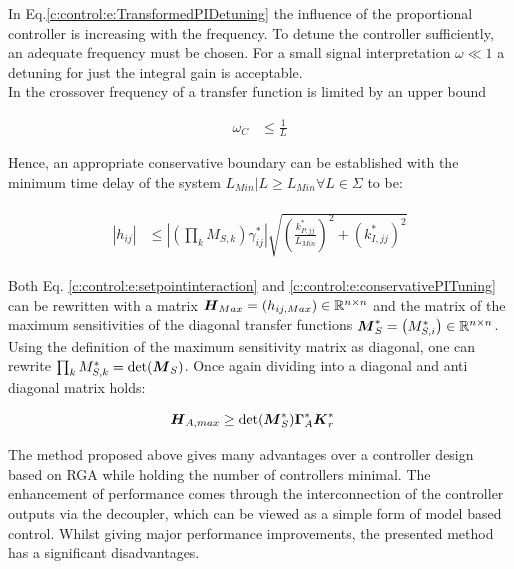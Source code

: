 In Eq.\ref{c:control:e:TransformedPIDetuning} the influence of the proportional controller is increasing with the frequency. To detune the controller sufficiently, an adequate frequency must be chosen. For a small signal interpretation $\omega \ll 1$ a detuning for just the integral gain is acceptable.\\

In \cite[p.172 f.]{Skogestad2005MultivariableDesign} the crossover frequency of a transfer function is limited by an upper bound

\begin{align}
\omega_C &\leq \frac{1}{L}
\end{align}

Hence, an appropriate conservative boundary can be established with the minimum time delay of the system $L_{Min} | L\geq L_{Min} \forall L \in \Sigma $ to be:

\begin{align}
\begin{split}
\left| h_{ij} \right| &\leq \left| \left(\prod_k M_{S,k} \right) \gamma_{ij}^*\right| \sqrt{\left(\frac{k_{P,jj}^*}{L_{Min}}\right)^2+ \left(k_{I,jj}^*\right)^2}
\end{split}
\label{c:control:e:conservativePITuning}
\end{align}

Both Eq. \ref{c:control:e:setpointinteraction} and \ref{c:control:e:conservativePITuning} can be rewritten with a matrix $\mbox{\boldmath$H$}_{Max} = \left(h_{ij,Max}\right) \in \mathbb{R}^{n \times n}$ and the matrix of the maximum sensitivities of the diagonal transfer functions $\mbox{\boldmath$M$}_S^* = \left(M_{S,i}^*\right) \in \mathbb{R}^{n \times n}$. Using the definition of the maximum sensitivity matrix as diagonal, one can rewrite $\prod_k M_{S,k}^* = \det(\mbox{\boldmath$M$}_S) $. Once again dividing into a diagonal and anti diagonal matrix holds:

\begin{align}
\begin{split}
\mbox{\boldmath$H$}_{A,max} &\geq \det(\mbox{\boldmath$M$}_S^*) \mbox{\boldmath$\Gamma$}_A^* \mbox{\boldmath$K$}_r^* 
\end{split}
\label{c:control:e:Hmax*}
\end{align}



The method proposed above gives many advantages over a controller design based on RGA while holding the number of controllers minimal. The enhancement of performance comes through the interconnection of the controller outputs via the decoupler, which can be viewed as a simple form of model based control. Whilst giving major performance improvements, the presented method has a significant disadvantages.\\ 

